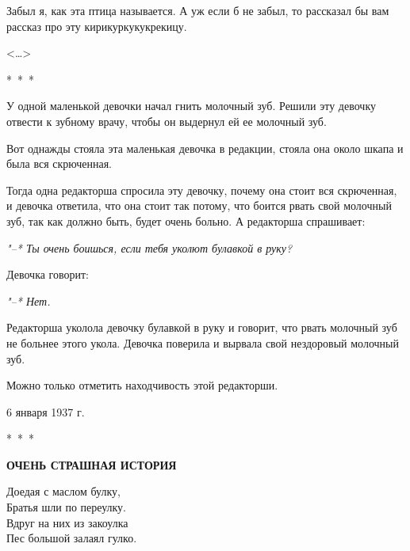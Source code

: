 \documentclass[12pt]{extarticle}
\begin{document}
Забыл я, как эта птица называется.  А уж
если б не забыл, то рассказал бы вам рассказ
про эту кирикуркукукрекицу.

\begin{flushright}
<\dots>
\end{flushright}

\begin{center}
\vspace{0.1cm}
\large
*~*~*
\end{center}


У одной  маленькой  девочки  начал гнить
молочный зуб.  Решили эту девочку  отвести к
зубному врачу, чтобы он выдернул ей ее молочный 
зуб.
    
Вот однажды стояла эта маленькая девочка
в редакции,  стояла  она  около шкапа и была
вся скрюченная.
    
Тогда  одна редакторша  спросила эту девочку,  
почему  она стоит вся скрюченная,  и
девочка ответила, что она  стоит так потому,
что боится рвать свой молочный зуб, так  как
должно быть, будет очень больно. А редакторша 
спрашивает:

\textit{"--* Ты очень боишься, если тебя уколют булавкой в руку?}
    
Девочка говорит:
    
\textit{"--* Нет.}
    
Редакторша  уколола девочку  булавкой  в
руку и говорит,  что  рвать  молочный зуб не
больнее  этого укола. Девочка поверила и вырвала 
свой нездоровый молочный зуб.
   
Можно  только отметить находчивость этой
редакторши.

\begin{flushright}
6 января 1937 г.
\end{flushright}

\begin{center}
\vspace{0.3cm}
\large
*~*~*

\vspace{0.3cm}
\bf
ОЧЕНЬ СТРАШНАЯ ИСТОРИЯ
\end{center}

\rm 

\begin{center}
\parbox{8.5cm}{\noindent Доедая с маслом булку, \\
Братья шли по переулку. \\
Вдруг на них из закоулка \\
Пес большой залаял гулко. 
}
\end{center}
\end{document}
